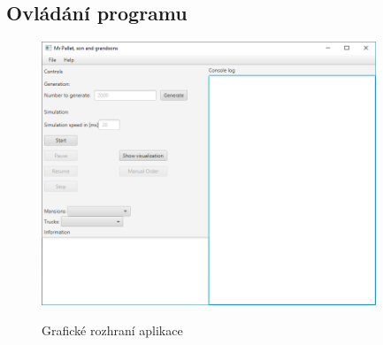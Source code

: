 \documentclass[ 12pt, a4paper]{article}
\begin{document}
\subsection{Ovládání programu}



\begin{figure}[!ht]
\centering
\includegraphics[width=10cm]{guipic.png}
\label{fig:guipic}
\caption{Grafické rozhraní aplikace}
\end{figure}
\end{document}
